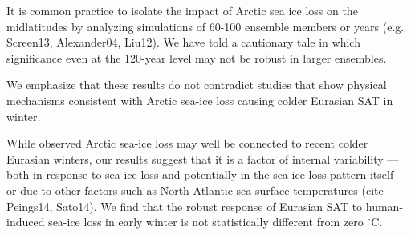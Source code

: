\documentclass[grl]{AGUTeX}  %
\begin{document}
\begin{article}
It is common practice to isolate the impact of Arctic sea ice loss on the midlatitudes by analyzing simulations of 60-100 ensemble members or years (e.g. Screen13, Alexander04, Liu12). We have told a cautionary tale in which significance even at the 120-year level may not be robust in larger ensembles.

We emphasize that these results do not contradict studies that show physical mechanisms consistent with Arctic sea-ice loss causing colder Eurasian SAT in winter. 

While observed Arctic sea-ice loss may well be connected to recent colder Eurasian winters, our results suggest that it is a factor of internal variability --- both in response to sea-ice loss and potentially in the sea ice loss pattern itself --- or due to other factors such as North Atlantic sea surface temperatures (cite Peings14, Sato14). We find that the robust response of Eurasian SAT to human-induced sea-ice loss in early winter is not statistically different from zero $^\circ$C.


%
%
%
%
%
%
%


\end{article}
\end{document}
